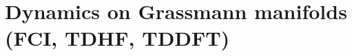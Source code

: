 \documentclass[11pt]{article}
\def\R{{\mathbb R}}
\newcommand \dps{\displaystyle }
\begin{document}



\section{Dynamics on Grassmann manifolds (FCI, TDHF, TDDFT)}
\label{sec:Grassmann}
\end{document}
